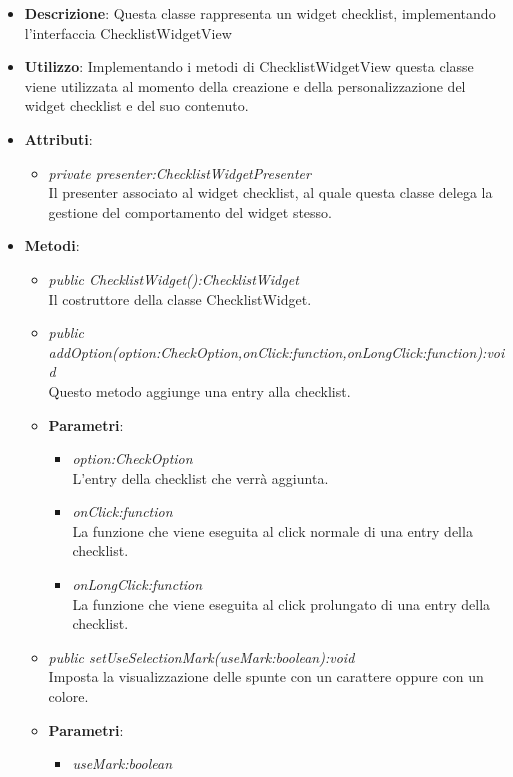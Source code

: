 \begin{itemize}
\item \textbf{Descrizione}: Questa classe rappresenta un widget checklist, implementando l'interfaccia ChecklistWidgetView
\item \textbf{Utilizzo}: Implementando i metodi di ChecklistWidgetView questa classe viene utilizzata al momento della creazione e della personalizzazione del widget checklist e del suo contenuto.
\item \textbf{Attributi}:
	\begin{itemize}
	\item \textit{private presenter:ChecklistWidgetPresenter}\\
	Il presenter associato al widget checklist, al quale questa classe delega la gestione del comportamento del widget stesso.
	\end{itemize}
\item \textbf{Metodi}:
	\begin{itemize}
	\item \textit{public ChecklistWidget():ChecklistWidget}\\
	Il costruttore della classe ChecklistWidget.
	\item \textit{public addOption(option:CheckOption,onClick:function,onLongClick:function):void}\\
	Questo metodo aggiunge una entry alla checklist.
		\item{\textbf{Parametri}: \begin{itemize}
		\item \textit{option:CheckOption}\\
		L'entry della checklist che verrà aggiunta.
		\item \textit{onClick:function}\\
		La funzione che viene eseguita al click normale di una entry della checklist.
		\item \textit{onLongClick:function}\\
		La funzione che viene eseguita al click prolungato di una entry della checklist.
		\end{itemize}}
	\item \textit{public setUseSelectionMark(useMark:boolean):void}\\
		Imposta la visualizzazione delle spunte con un carattere oppure con un colore.
			\item{\textbf{Parametri}: \begin{itemize}
			\item \textit{useMark:boolean}\\

\end{itemize}}
\end{itemize}
\end{itemize}
